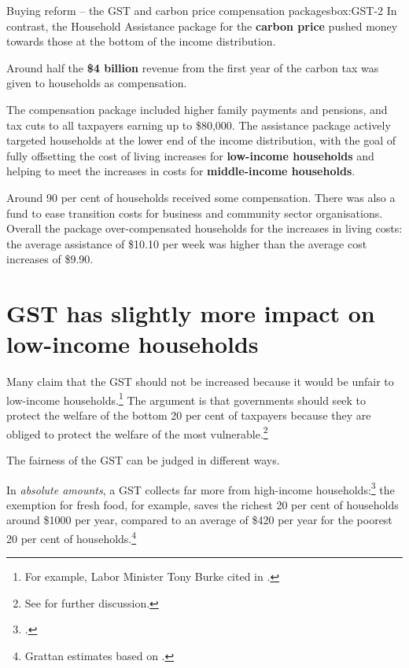 \begin{bigboxC*}{Buying reform -- the GST and carbon price compensation packages}{box:GST-2}
In contrast, the Household Assistance package for the \textbf{carbon price} pushed money towards those at the bottom of the income distribution. 

Around half the \textbf{\$4 billion} revenue from the first year of the carbon tax was given to households as compensation.  

The compensation package included higher family payments and pensions, and tax cuts to all taxpayers earning up to \$80,000. The assistance package actively targeted households at the lower end of the income distribution, with the goal of fully offsetting the cost of living increases for \textbf{low-income households} and helping to meet the increases in costs for \textbf{middle-income households}. 

Around 90 per cent of households received some compensation. There was also a fund to ease transition costs for business and community sector organisations. Overall the package over-compensated households for the increases in living costs: the average assistance of \$10.10 per week was higher than the average cost increases of \$9.90. 


\end{bigboxC*}

\section{GST has slightly more impact on low-income households}\label{sec:GST-3-1}
Many claim that the GST should not be increased because it would be unfair to low-income households.\footnote{For example, Labor Minister Tony Burke cited in \textcite{Hutchens2015-ALP-not-support-GST}.}  The argument is that governments should seek to protect the welfare of the bottom 20 per cent of taxpayers because they are obliged to protect the welfare of the most vulnerable.\footnote{See \textcite[][21]{Daley2013} for further discussion.}

The fairness of the GST can be judged in different ways. 

In \emph{absolute amounts}, a GST collects far more from high-income households:\footcites{OECDKoreaInstitutePublicFinance2014-Distributional-Effects-Consumption-Taxes}{Freebairn2013}{HenryTaxReview2010}
the exemption for fresh food, for example, saves the richest 20 per cent of households around \$1000 per year, compared to an average of \$420 per year for the poorest 20 per cent of households.\footnote{Grattan estimates based on \textcites{Treasury2015TES2014}{ABS2011HES0910curf}.}

